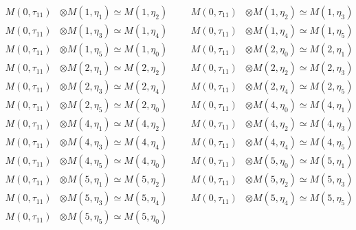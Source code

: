 \begin{align*}
M(0,\tau_{11}) &\otimes M(1,\eta_{1}) \simeq M(1,\eta_{2}) &&& M(0,\tau_{11}) &\otimes M(1,\eta_{2}) \simeq M(1,\eta_{3})\\
M(0,\tau_{11}) &\otimes M(1,\eta_{3}) \simeq M(1,\eta_{4}) &&& M(0,\tau_{11}) &\otimes M(1,\eta_{4}) \simeq M(1,\eta_{5})\\
M(0,\tau_{11}) &\otimes M(1,\eta_{5}) \simeq M(1,\eta_{0}) &&& M(0,\tau_{11}) &\otimes M(2,\eta_{0}) \simeq M(2,\eta_{1})\\
M(0,\tau_{11}) &\otimes M(2,\eta_{1}) \simeq M(2,\eta_{2}) &&& M(0,\tau_{11}) &\otimes M(2,\eta_{2}) \simeq M(2,\eta_{3})\\
M(0,\tau_{11}) &\otimes M(2,\eta_{3}) \simeq M(2,\eta_{4}) &&& M(0,\tau_{11}) &\otimes M(2,\eta_{4}) \simeq M(2,\eta_{5})\\
M(0,\tau_{11}) &\otimes M(2,\eta_{5}) \simeq M(2,\eta_{0}) &&& M(0,\tau_{11}) &\otimes M(4,\eta_{0}) \simeq M(4,\eta_{1})\\
M(0,\tau_{11}) &\otimes M(4,\eta_{1}) \simeq M(4,\eta_{2}) &&& M(0,\tau_{11}) &\otimes M(4,\eta_{2}) \simeq M(4,\eta_{3})\\
M(0,\tau_{11}) &\otimes M(4,\eta_{3}) \simeq M(4,\eta_{4}) &&& M(0,\tau_{11}) &\otimes M(4,\eta_{4}) \simeq M(4,\eta_{5})\\
M(0,\tau_{11}) &\otimes M(4,\eta_{5}) \simeq M(4,\eta_{0}) &&& M(0,\tau_{11}) &\otimes M(5,\eta_{0}) \simeq M(5,\eta_{1})\\
M(0,\tau_{11}) &\otimes M(5,\eta_{1}) \simeq M(5,\eta_{2}) &&& M(0,\tau_{11}) &\otimes M(5,\eta_{2}) \simeq M(5,\eta_{3})\\
M(0,\tau_{11}) &\otimes M(5,\eta_{3}) \simeq M(5,\eta_{4}) &&& M(0,\tau_{11}) &\otimes M(5,\eta_{4}) \simeq M(5,\eta_{5})\\
M(0,\tau_{11}) &\otimes M(5,\eta_{5}) \simeq M(5,\eta_{0})
\end{align*}

